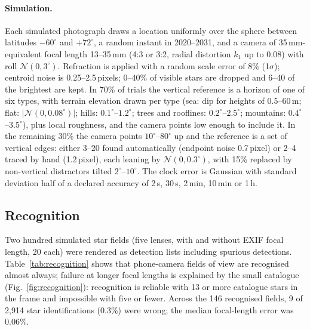 \documentclass[11pt,a4paper]{article}
\begin{document}
\paragraph{Simulation.} Each simulated photograph draws a location uniformly over the sphere between latitudes $-60^\circ$ and $+72^\circ$, a random instant in 2020--2031, and a camera of 35\,mm-equivalent focal length 13--35\,mm (4:3 or 3:2, radial distortion $k_1$ up to 0.08) with roll $\mathcal N(0,3^\circ)$. Refraction is applied with a random scale error of 8\% (1$\sigma$); centroid noise is 0.25--2.5\,pixels; 0--40\% of visible stars are dropped and 6--40 of the brightest are kept. In 70\% of trials the vertical reference is a horizon of one of six types, with terrain elevation drawn per type (sea: dip for heights of 0.5--60\,m; flat: $|\mathcal N(0,0.08^\circ)|$; hills: $0.1^\circ$--$1.2^\circ$; trees and rooflines: $0.2^\circ$--$2.5^\circ$; mountains: $0.4^\circ$--$3.5^\circ$), plus local roughness, and the camera points low enough to include it. In the remaining 30\% the camera points $10^\circ$--$80^\circ$ up and the reference is a set of vertical edges: either 3--20 found automatically (endpoint noise 0.7\,pixel) or 2--4 traced by hand (1.2\,pixel), each leaning by $\mathcal N(0,0.3^\circ)$, with 15\% replaced by non-vertical distractors tilted $2^\circ$--$10^\circ$. The clock error is Gaussian with standard deviation half of a declared accuracy of 2\,s, 30\,s, 2\,min, 10\,min or 1\,h.

\subsection{Recognition}

Two hundred simulated star fields (five lenses, with and without EXIF focal length, 20 each) were rendered as detection lists including spurious detections. Table~\ref{tab:recognition} shows that phone-camera fields of view are recognised almost always; failure at longer focal lengths is explained by the small catalogue (Fig.~\ref{fig:recognition}): recognition is reliable with 13 or more catalogue stars in the frame and impossible with five or fewer. Across the 146 recognised fields, 9 of 2{,}914 star identifications (0.3\%) were wrong; the median focal-length error was 0.06\%.
\end{document}
